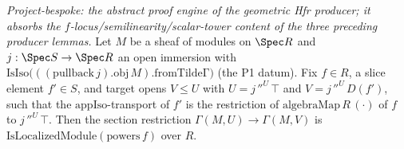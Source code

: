 \begin{lemma}
  \label{lem:section_localization_hfr_aux}
  \textit{Project-bespoke: the abstract proof engine of the geometric Hfr producer; it absorbs the
  $f$-locus/semilinearity/scalar-tower content of the three preceding producer lemmas.}
  Let \(M\) be a sheaf of modules on \(\Spec R\) and \(j : \Spec S \to \Spec R\) an open immersion with
  \(\mathrm{IsIso}\bigl(((\mathrm{pullback}\,j).\mathrm{obj}\,M).\mathrm{fromTildeΓ}\bigr)\) (the P1
  datum). Fix \(f \in R\), a slice element \(f' \in S\), and target opens \(V \le U\) with
  \(U = j\,''^{U}\,\top\) and \(V = j\,''^{U}\,D(f')\), such that the \(\mathrm{appIso}\)-transport of
  \(f'\) is the restriction of \(\mathrm{algebraMap}\,R\,(\cdot)\) of \(f\) to \(j\,''^{U}\,\top\). Then
  the section restriction \(\Gamma(M, U) \to \Gamma(M, V)\) is
  \(\mathrm{IsLocalizedModule}(\mathrm{powers}\,f)\) over \(R\).
\end{lemma}
